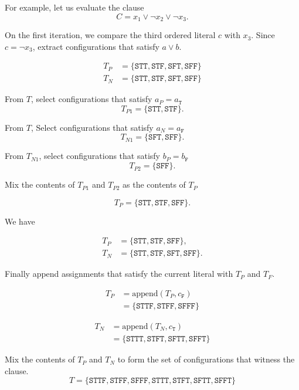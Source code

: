 For example, let us evaluate the clause
\[
C = x_1 \vee \neg x_2 \vee \neg x_3.
\]

On the first iteration, we compare the third ordered literal $c$ with $x_3$.  Since $c = \neg x_3$, extract configurations that satisfy $a \vee b$.  

\begin{align*}
T_P &= \{ \texttt{STT}, \texttt{STF}, \texttt{SFT}, \texttt{SFF}\} \\
T_N &= \{ \texttt{STT}, \texttt{STF}, \texttt{SFT}, \texttt{SFF}\} 
\end{align*}

\noindent From $T$, select configurations that satisfy $a_P = a_{\texttt{T}}$
\[
T_{P1} = \{ \texttt{STT}, \texttt{STF} \}.
\]

\noindent From $T$, Select configurations that satisfy $a_N = a_{\texttt{F}}$
\[
T_{N1} = \{ \texttt{SFT}, \texttt{SFF} \}.
\]

\noindent From $T_{N1}$, select configurations that satisfy $b_P = b_{\texttt{F}}$
\[
T_{P2} = \{ \texttt{SFF} \}.
\]

\noindent Mix the contents of $T_{P1}$ and $T_{P2}$ as the contents of $T_P$

\[
T_P = \{ \texttt{STT}, \texttt{STF}, \texttt{SFF} \}.
\]

\noindent We have 

\begin{align*}
T_P &= \{ \texttt{STT}, \texttt{STF}, \texttt{SFF} \}, \\
T_N &= \{ \texttt{STT}, \texttt{STF}, \texttt{SFT}, \texttt{SFF}\}.
\end{align*}

Finally append assignments that satisfy the current literal with $T_P$ and $T_F$.

\begin{align*}
T_P &= \text{append}(T_P, c_{\texttt{F}}) \\
	&= \{ \texttt{STTF}, \texttt{STFF}, \texttt{SFFF} \}
\end{align*}

\begin{align*}
T_N &= \text{append}(T_N, c_{\texttt{T}}) \\
	&= \{ \texttt{STTT}, \texttt{STFT}, \texttt{SFTT}, \texttt{SFFT}\}
\end{align*}

\noindent Mix the contents of $T_P$ and $T_N$ to form the set of configurations that witness the clause. 
\[
T = \{ \texttt{STTF}, \texttt{STFF}, \texttt{SFFF},  \texttt{STTT}, \texttt{STFT}, \texttt{SFTT}, \texttt{SFFT}\}
\]
		
